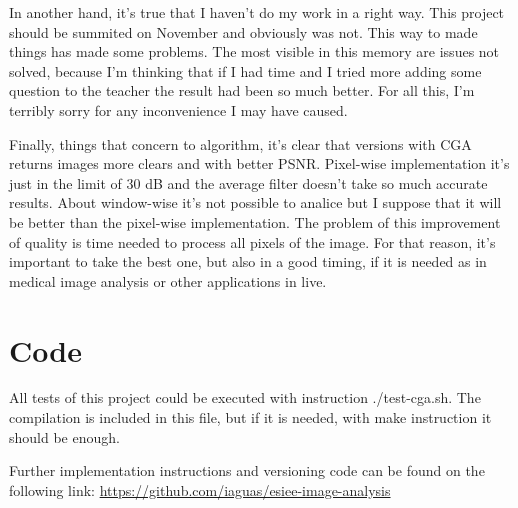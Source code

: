\documentclass[a4paper,11pt,final]{article}
\begin{document}
In another hand, it's true that I haven't do my work in a right way. This project should be summited on November and obviously was not. This way to made things has made some problems. The most visible in this memory are issues not solved, because I'm thinking that if I had time and I tried more adding some question to the teacher the result had been so much better. For all this, I'm terribly sorry for any inconvenience I may have caused.

Finally, things that concern to algorithm, it's clear that versions with CGA returns images more clears and with better PSNR. Pixel-wise implementation it's just in the limit of 30 dB and the average filter doesn't take so much accurate results. About window-wise it's not possible to analice but I suppose that it will be better than the pixel-wise implementation. The problem of this improvement of quality is time needed to process all pixels of the image. For that reason, it's important to take the best one, but also in a good timing, if it is needed as in medical image analysis or other applications in live.

\appendix
\section{Code}
All tests of this project could be executed with instruction {\ttfamily ./test-cga.sh}. The compilation is included in this file, but if it is needed, with {\ttfamily make} instruction it should be enough.

Further implementation instructions and versioning code can be found on the following link: \href{https://github.com/iaguas/esiee-image-analysis}{https://github.com/iaguas/esiee-image-analysis}
\end{document}
